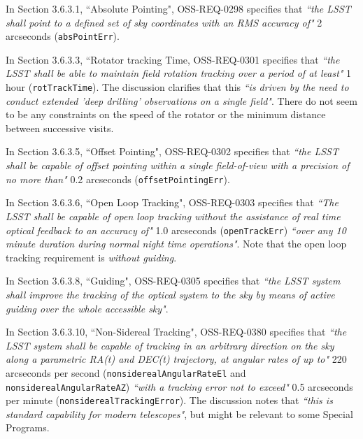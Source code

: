 In Section 3.6.3.1, ``Absolute Pointing", OSS-REQ-0298 specifies that {\it ``the LSST shall point to a defined set of sky coordinates with an RMS accuracy
of"} 2 arcseconds ({\tt absPointErr}).

In Section 3.6.3.3, ``Rotator tracking Time, OSS-REQ-0301 specifies that {\it ``the LSST shall be able to maintain field rotation tracking over a period of at least"} 1 hour ({\tt rotTrackTime}).
The discussion clarifies that this {\it ``is driven by the need to conduct extended 'deep drilling' observations on a single field"}.
There do not seem to be any constraints on the speed of the rotator or the minimum distance between successive visits.

In Section 3.6.3.5, ``Offset Pointing", OSS-REQ-0302 specifies that {\it ``the LSST shall be capable of offset pointing within a single field-of-view with a precision of no more than"} 0.2 arcseconds ({\tt offsetPointingErr}).

In Section 3.6.3.6, ``Open Loop Tracking", OSS-REQ-0303 specifies that {\it ``The LSST shall be capable of open loop tracking without the assistance of real time optical feedback to an accuracy of"} 1.0 arcseconds ({\tt openTrackErr}) {\it ``over any 10 minute duration during normal night time operations"}.
Note that the open loop tracking requirement is \emph{without guiding}.

In Section 3.6.3.8, ``Guiding", OSS-REQ-0305 specifies that {\it ``the LSST system shall improve the tracking of the optical system to the sky by means of active guiding over the whole accessible sky"}.

In Section 3.6.3.10, ``Non-Sidereal Tracking", OSS-REQ-0380 specifies that {\it ``the LSST system shall be capable of tracking in an arbitrary direction on the sky along a parametric RA(t) and DEC(t) trajectory, at angular rates of up to"} 220 arcseconds per second ({\tt nonsiderealAngularRateEl} and {\tt nonsiderealAngularRateAZ}) {\it ``with a tracking error not to exceed"} 0.5 arcseconds per minute ({\tt nonsiderealTrackingError}).
The discussion notes that {\it ``this is standard capability for modern telescopes"}, but might be relevant to some Special Programs.


